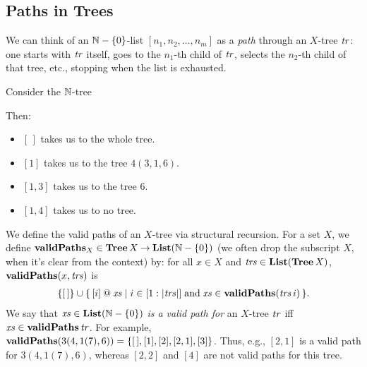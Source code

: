 \subsection{Paths in Trees}

We can think of an $\mathbb{N}-\{0\}$-list $[n_1, n_2, \ldots, n_m]$ as a
\emph{path} through an $X$-tree ${\it tr}$: one starts with ${\it tr}$ itself,
goes to the $n_1$-th child of ${\it tr}$, selects the $n_2$-th child of
that tree, etc., stopping when the list is exhausted.

Consider the $\mathbb{N}$-tree
\begin{center}

\end{center}
Then:
\begin{itemize}
\item $[\,]$ takes us to the whole tree.

\item $[1]$ takes us to the tree $4(3,1,6)$.

\item $[1, 3]$ takes us to the tree $6$.

\item $[1, 4]$ takes us to no tree.
\end{itemize}

We define the valid paths of an $X$-tree via structural recursion.
For a set $X$, we define $\mathbf{validPaths}_X\in\mathbf{Tree}\,X\mathbin{\to}\mathbf{List}(\mathbb{N}-\{0\})$
(we often drop the subscript $X$, when it's clear from the context)
by: for all $x\in X$ and ${\it trs}\in\mathbf{List}(\mathbf{Tree}\,X)$,
$\mathbf{validPaths}(x, {\it trs})$ is
\begin{gather*}
\{[\,]\} \cup
\{ \, [i]\mathbin{@}{\it xs} \mid i\in[1:|{\it trs}|]\;\allowbreak\mbox{and}\allowbreak\;{\it xs}\in\mathbf{validPaths}({\it trs}\,i) \, \} .
\end{gather*}
We say that ${\it xs}\in\mathbf{List}(\mathbb{N}-\{0\})$ \emph{is a valid path for}
an $X$-tree ${\it tr}$ iff ${\it xs}\in\mathbf{validPaths}\,{\it tr}$.
For example, $\mathbf{validPaths}(3(4,1(7),6)) = \{[\,], [1], [2], [2,1], [3]\}$.
Thus, e.g.,  $[2,1]$ is a valid path for $3(4,1(7),6)$, whereas
$[2,2]$ and $[4]$ are not valid paths for this tree.

